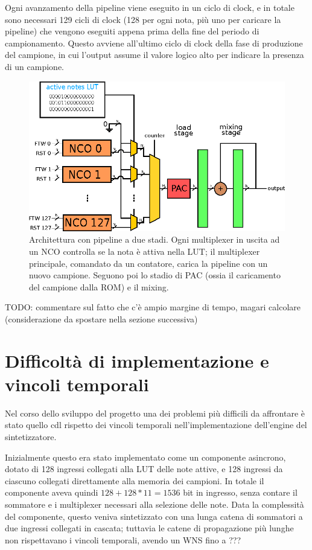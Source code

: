 Ogni avanzamento della pipeline viene eseguito in un ciclo di clock,
e in totale sono necessari 129 cicli di clock
(128 per ogni nota, più uno per caricare la pipeline) che vengono eseguiti
appena prima della fine del periodo di campionamento.
Questo avviene all'ultimo ciclo di clock della fase di produzione del
campione, in cui l'output  assume il valore
logico alto per indicare la presenza di un campione.
\begin{figure}
	\centering
	\def\svgwidth{\columnwidth}
	\includegraphics[width=\columnwidth]{TeX_files/synth_engine.eps}
	\caption{Architettura con pipeline a due stadi. Ogni multiplexer
	 in uscita ad un NCO controlla se la nota è attiva nella LUT; il
     multiplexer principale, comandato da un contatore, carica la pipeline
     con un nuovo campione. Seguono poi lo stadio di PAC (ossia il caricamento del campione dalla ROM) e il mixing.}
\end{figure}

TODO: commentare sul fatto che c'è ampio margine di tempo, magari calcolare
      (considerazione da spostare nella sezione successiva)

\section{Difficoltà di implementazione e vincoli temporali}
\label{sec:timing_impl}
Nel corso dello sviluppo del progetto una dei problemi più difficili da affrontare
è stato quello cdl rispetto dei vincoli temporali nell'implementazione dell'engine
del sintetizzatore.

Inizialmente questo era stato implementato come un componente asincrono, dotato di 
128 ingressi collegati alla LUT delle note attive, e 128 ingressi da 
ciascuno collegati direttamente alla memoria dei campioni.
In totale il componente aveva quindi $128+128*11 = 1536$ bit in ingresso, senza contare
il sommatore e i multiplexer necessari alla selezione delle note.
Data la complessità del componente, questo veniva sintetizzato con una lunga catena
di sommatori a due ingressi collegati in cascata; tuttavia le catene di propagazione più lunghe
non rispettavano i vincoli temporali, avendo un WNS fino a ???

